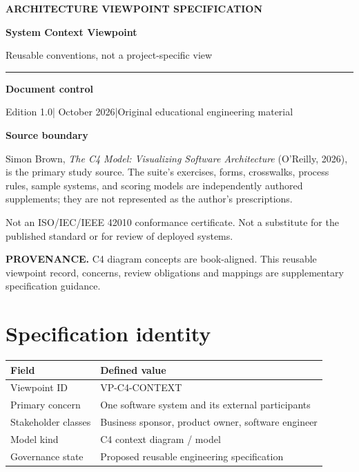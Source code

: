 \documentclass[10pt,letterpaper]{article}
\newcommand{\SourceNote}[1]{\par\smallskip\noindent\colorbox{C4Light}{\parbox{0.94\linewidth}{\footnotesize\textbf{PROVENANCE.} #1}}\par\medskip}
\newcommand{\DocStart}[3]{%
\begin{document}
\begin{titlepage}
\renewcommand{\thepage}{title-\arabic{page}}
\vspace*{0.55in}
{\sffamily\bfseries\small\color{C4Teal}#1}\par\vspace{0.24in}
{\sffamily\bfseries\fontsize{26}{31}\selectfont\color{C4Navy}#2}\par\vspace{0.18in}
{\large\color{C4Gray}#3}\par\vspace{0.4in}
\textcolor{C4Teal}{\rule{\linewidth}{1.15pt}}\par\vspace{0.24in}
\textbf{Document control}\par
Edition 1.0\quad|\quad 30 October 2026\quad|\quad Original educational engineering material\par
\vspace{0.17in}
\textbf{Source boundary}\par
Simon Brown, \emph{The C4 Model: Visualizing Software Architecture} (O'Reilly, 2026), is the primary study source. The suite's exercises, forms, crosswalks, process rules, sample systems, and scoring models are independently authored supplements; they are not represented as the author's prescriptions.\par
\vfill
{\small\color{C4Gray}Not an ISO/IEC/IEEE 42010 conformance certificate. Not a substitute for the published standard or for review of deployed systems.}\par
\end{titlepage}
}
\DocStart{ARCHITECTURE VIEWPOINT SPECIFICATION}{System Context Viewpoint}{Reusable conventions, not a project-specific view}
\SourceNote{C4 diagram concepts are book-aligned. This reusable viewpoint record, concerns, review obligations and mappings are supplementary specification guidance.}
\section{Specification identity}
\begin{tabularx}{\linewidth}{@{}YY@{}}\toprule
\textbf{Field} & \textbf{Defined value} \\ \midrule
Viewpoint ID & VP-C4-CONTEXT \\
Primary concern & One software system and its external participants \\
Stakeholder classes & Business sponsor, product owner, software engineer \\
Model kind & C4 context diagram / model \\
Governance state & Proposed reusable engineering specification \\
\bottomrule\end{tabularx}
\end{document}
